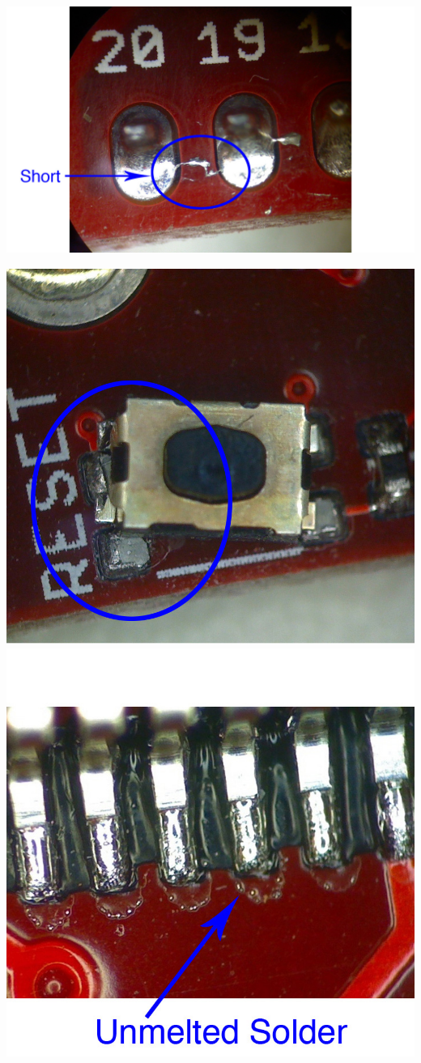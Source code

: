 \documentclass[a4paper,12pt]{report}
\begin{document}
\begin{center}
\includegraphics[width=.9\linewidth]{header-short}

\includegraphics[width=.7\linewidth]{overheated-reset-button}
\includegraphics[width=.8\linewidth]{unmelted-solder}
\end{center}
\end{document}
